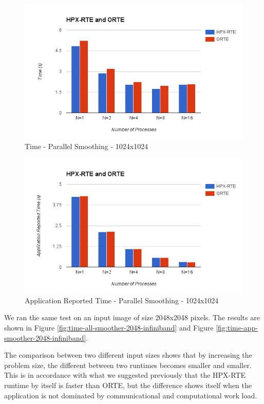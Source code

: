 \begin{figure}[h!]
\centering
\includegraphics[scale=0.7]{images/time-all-smoother-1024-infiniband.png}
\caption[Time - Parallel Smoothing - 1024x1024]{Time - Parallel Smoothing - 1024x1024}
\label{fig:time-all-smoother-1024-infiniband}
\end{figure}

\begin{figure}[h!]
\centering
\includegraphics[scale=0.7]{images/time-app-smoother-1024-infiniband.png}
\caption[Application Reported Time - Parallel Smoothing - 1024x1024]{Application Reported Time - Parallel Smoothing - 1024x1024}
\label{fig:time-app-smoother-1024-infiniband}
\end{figure}

We ran the same test on an input image of size 2048x2048 pixels. The results are shown in Figure \ref{fig:time-all-smoother-2048-infiniband} and Figure \ref{fig:time-app-smoother-2048-infiniband}.

The comparison between two different input sizes shows that by increasing the problem size, the different between two runtimes becomes smaller and smaller. This is in accordance with what we suggested previously that the HPX-RTE runtime by itself is faster than ORTE, but the difference shows itself when the application is not dominated by communicational and computational work load.

